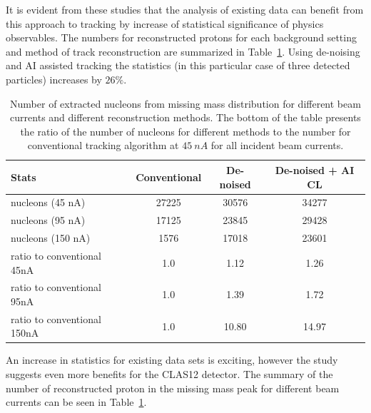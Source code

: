 It is evident from these studies that the analysis of existing data can benefit from this approach to tracking by increase 
of statistical significance of physics observables. The numbers for reconstructed protons for each background setting 
and method of track reconstruction are summarized in Table~\ref{table:summary}. Using de-noising and AI assisted 
tracking the statistics (in this particular case of three detected particles) increases by $26\%$. 

\begin{table}
\begin{center}
\begin{tabular}{l|ccc}
Stats & Conventional & De-noised & De-noised + AI CL \\
\hline
 nucleons (45 nA)  & 27225 &  30576 & 34277 \\
 nucleons (95 nA)  & 17125 & 23845 & 29428 \\
 nucleons (150 nA) &  1576 & 17018 & 23601 \\
\hline
\hline
ratio to conventional 45nA & 1.0 & 1.12 & 1.26 \\
ratio to conventional 95nA & 1.0 & 1.39 & 1.72 \\
ratio to conventional 150nA & 1.0 & 10.80 & 14.97 \\
\end{tabular}
\end{center}
\caption{Number of extracted nucleons from missing mass distribution for different beam currents
and different reconstruction methods. The bottom of the table presents the ratio of the number of nucleons for
different methods to the number for conventional tracking algorithm at $45~nA$ for all incident beam currents.}
 \label{table:summary}
\end{table}

An increase in statistics for existing data sets is exciting, however the study suggests even more benefits for 
the CLAS12 detector. The summary of the number of reconstructed proton in the missing mass peak for
different beam currents can be seen in Table~\ref{table:summary}.

